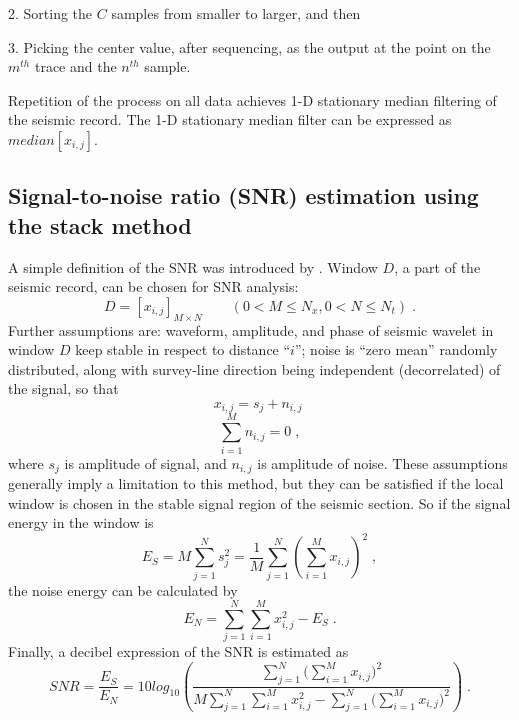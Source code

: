 2. Sorting the $C$ samples from smaller to larger, and then

3. Picking the center value, after sequencing, as the output at the point on the $m^{th}$ trace 
and the $n^{th}$ sample.

Repetition of the process on all data achieves 
1-D stationary median filtering of the seismic record. The 1-D stationary median 
filter can be expressed as $median[x_{i,j}]$.

\subsection{Signal-to-noise ratio (SNR) estimation using the stack method}

A simple definition of the SNR was introduced by \cite{Liu97}. Window $D$, a part 
of the seismic record, can be chosen for SNR analysis: 
      \begin{equation}
        \label{eq:eq5}
          D = [x_{i,j}]_{M \times N} \qquad (0< M \le N_x, 0< N \le N_t)\;.
      \end{equation}
Further assumptions are: waveform, amplitude, and phase of seismic 
wavelet in window $D$ keep stable in respect to distance ``$i$''; noise is
``zero mean'' randomly distributed, along with survey-line direction being independent 
(decorrelated) of the signal, so that
      \begin{equation}
        \label{eq:eq6}
          x_{i,j} = s_j + n_{i,j}\;
      \end{equation}
      \begin{equation}
        \label{eq:eq7}
          \sum_{i=1}^{M} n_{i,j} = 0\;,
      \end{equation}
where $s_j$ is amplitude of signal, and $n_{i,j}$ is amplitude of noise. These 
assumptions generally imply a limitation to this method, but they 
can be satisfied if the local window is chosen in the stable signal region of the 
seismic section. So if the signal energy in the window is 
      \begin{equation}
        \label{eq:eq8}
          E_S = M\sum_{j=1}^{N} s_{j}^2 = \frac{1}{M} \sum_{j=1}^{N}(\sum_{i=1}^{M}x_{i,j})^2\;,
      \end{equation}
the noise energy can be calculated by
      \begin{equation}
        \label{eq:eq9}
          E_N = \sum_{j=1}^{N}\! \sum_{i=1}^{M}x_{i,j}^2 - E_S\;.
      \end{equation}
Finally, a decibel expression of the SNR is estimated as
      \begin{equation}
        \label{eq:eq10}
          SNR = \frac{E_S}{E_N} = 10log_{10}\left(\frac{\displaystyle\sum_{j=1}^{N}\big(\sum_{i=1}^{M}x_{i,j}\big)^2} 
         {\displaystyle M\sum_{j=1}^{N}\! \sum_{i=1}^{M}x_{i,j}^2-\sum_{j=1}^{N}\big(\sum_{i=1}^{M}x_{i,j}\big)^2}\right)\;.
      \end{equation}

